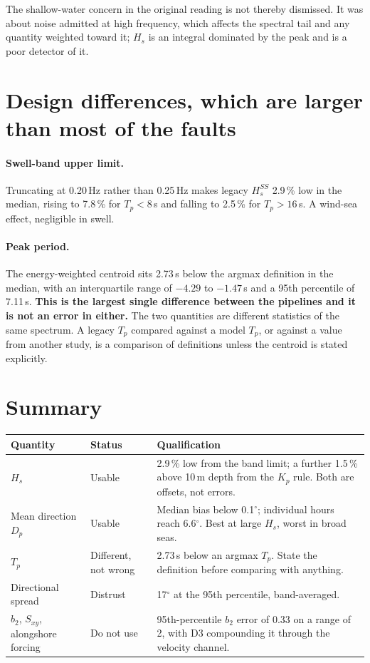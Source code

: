 \documentclass[11pt]{article}
\begin{document}
The shallow-water concern in the original reading is not thereby dismissed. It
was about noise admitted at high frequency, which affects the spectral tail and
any quantity weighted toward it; $H_s$ is an integral dominated by the peak and
is a poor detector of it.

\section{Design differences, which are larger than most of the faults}

\paragraph{Swell-band upper limit.} Truncating at 0.20\,Hz rather than 0.25\,Hz
makes legacy $H_s^{SS}$ 2.9\,\% low in the median, rising to 7.8\,\% for
$T_p < 8$\,s and falling to 2.5\,\% for $T_p > 16$\,s. A wind-sea effect,
negligible in swell.

\paragraph{Peak period.} The energy-weighted centroid sits 2.73\,s below the
argmax definition in the median, with an interquartile range of $-4.29$ to
$-1.47$\,s and a 95th percentile of 7.11\,s. \textbf{This is the largest single
difference between the pipelines and it is not an error in either.} The two
quantities are different statistics of the same spectrum. A legacy $T_p$
compared against a model $T_p$, or against a value from another study, is a
comparison of definitions unless the centroid is stated explicitly.

\section{Summary}
\label{sec:summary}

\begin{longtable}{@{}p{}p{}p{}@{}}
  \toprule
  Quantity & Status & Qualification \\
  \midrule
  \endhead
  $H_s$ & Usable & 2.9\,\% low from the band limit; a further 1.5\,\% above
  10\,m depth from the $K_p$ rule. Both are offsets, not errors. \\
  \addlinespace
  Mean direction $D_p$ & Usable & Median bias below 0.1$^\circ$; individual hours
  reach 6.6$^\circ$. Best at large $H_s$, worst in broad seas. \\
  \addlinespace
  $T_p$ & Different, not wrong & 2.73\,s below an argmax $T_p$. State the
  definition before comparing with anything. \\
  \addlinespace
  Directional spread & Distrust & 17$^\circ$ at the 95th percentile,
  band-averaged. \\
  \addlinespace
  $b_2$, $S_{xy}$, alongshore forcing & Do not use & 95th-percentile $b_2$ error
  of 0.33 on a range of 2, with D3 compounding it through the velocity channel. \\
  \bottomrule
\end{longtable}
\end{document}
